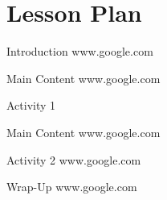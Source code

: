 \documentclass[main.tex]{subfiles}
\begin{document}
\section*{Lesson Plan}

\begin{comment}
  
  \planItem{5}                %
  {Introduction}              %
  {lesson notes and content}  %
  {url}                       %

\end{comment}

{Introduction}
{\Blindtext [1] [1]}
{www.google.com}

{Main Content}
{\Blindtext [2] [1]}
{www.google.com}

{Activity 1}
{\Blindtext [1] [1]}
{}

{Main Content}
{\Blindtext [2] [1]}
{www.google.com}

{Activity 2}
{\Blindtext [1] [1]}
{www.google.com}

{Wrap-Up}
{\Blindtext [1] [1]}
{www.google.com}
\end{document}
